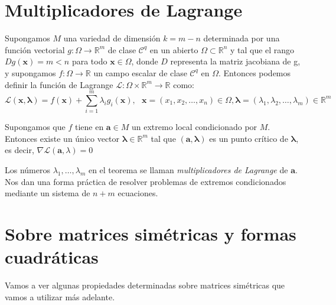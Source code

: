 

\section{Multiplicadores de Lagrange}

\begin{definicion}
Supongamos $M$ una variedad de dimensión $k=m-n$ determinada por una función vectorial $g: \Omega \rightarrow \mathbb{R}^m$ de clase $\mathcal{C}^q$ en un abierto $\Omega \subset \mathbb{R}^n$ y tal que el rango $Dg(\mathbf{x}) = m < n$ para todo $\mathbf{x} \in \Omega$, donde $D$ representa la matriz jacobiana de g, y supongamos $f: \Omega \rightarrow \mathbb{R}$ un campo escalar de clase $\mathcal{C}^q$ en $\Omega$. Entonces podemos definir la función de Lagrange $\mathcal{L}: \Omega \times \mathbb{R}^m \rightarrow \mathbb{R}$ como:
\[	\mathcal{L}(\mathbf{x}, \mathbf{\lambda}) = f(\mathbf{x}) + \sum_{i=1}^{m} \lambda_ig_i(\mathbf{x}), \ \ \  \mathbf{x} = (x_1, x_2, \dots, x_n) \in \Omega, \mathbf{\lambda} = (\lambda_1, \lambda_2, \dots, \lambda_m) \in \mathbb{R}^m	\]
\end{definicion}

\begin{teorema}[de Lagrange]
Supongamos que $f$ tiene en $\mathbf{a} \in M$ un extremo local condicionado por $M$. Entonces existe un único vector $\mathbf{\lambda} \in \mathbb{R}^m$ tal que $(\mathbf{a}, \mathbf{\lambda})$ es un punto crítico de $\mathbf{\lambda}$, es decir, $\nabla \mathcal{L}(\mathbf{a}, \mathbb{\lambda}) = 0$
\end{teorema}

Los números $\lambda_1, \dots, \lambda_m$ en el teorema se llaman \textit{multiplicadores de Lagrange} de $\mathbf{a}$. Nos dan una forma práctica de resolver problemas de extremos condicionados mediante un sistema de $n+m$ ecuaciones.

\section{Sobre matrices simétricas y formas cuadráticas}
Vamos a ver algunas propiedades determinadas sobre matrices simétricas que vamos a utilizar más adelante.\\

